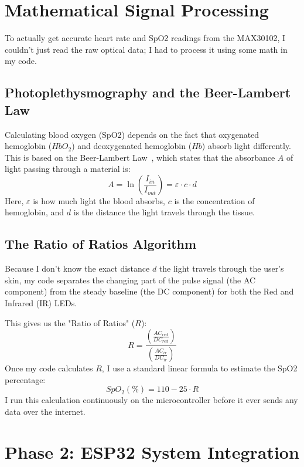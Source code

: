 \documentclass[12pt,a4paper,oneside]{report}
\begin{document}
\chapter{Mathematical Signal Processing}
To actually get accurate heart rate and SpO2 readings from the MAX30102, I couldn't just read the raw optical data; I had to process it using some math in my code.

\section{Photoplethysmography and the Beer-Lambert Law}
Calculating blood oxygen (SpO2) depends on the fact that oxygenated hemoglobin ($HbO_2$) and deoxygenated hemoglobin ($Hb$) absorb light differently. This is based on the Beer-Lambert Law~\cite{webster1997design}, which states that the absorbance $A$ of light passing through a material is:
\begin{equation}
    A = \ln\left(\frac{I_{in}}{I_{out}}\right) = \varepsilon \cdot c \cdot d
\end{equation}
Here, $\varepsilon$ is how much light the blood absorbs, $c$ is the concentration of hemoglobin, and $d$ is the distance the light travels through the tissue.

\section{The Ratio of Ratios Algorithm}
Because I don't know the exact distance $d$ the light travels through the user's skin, my code separates the changing part of the pulse signal (the AC component) from the steady baseline (the DC component) for both the Red and Infrared (IR) LEDs.

This gives us the "Ratio of Ratios" ($R$):
\begin{equation}
    R = \frac{\left( \frac{AC_{red}}{DC_{red}} \right)}{\left( \frac{AC_{ir}}{DC_{ir}} \right)}
\end{equation}
Once my code calculates $R$, I use a standard linear formula to estimate the SpO2 percentage:
\begin{equation}
    SpO_2 (\%) = 110 - 25 \cdot R
\end{equation}
I run this calculation continuously on the microcontroller before it ever sends any data over the internet.


\chapter{Phase 2: ESP32 System Integration}
\end{document}
